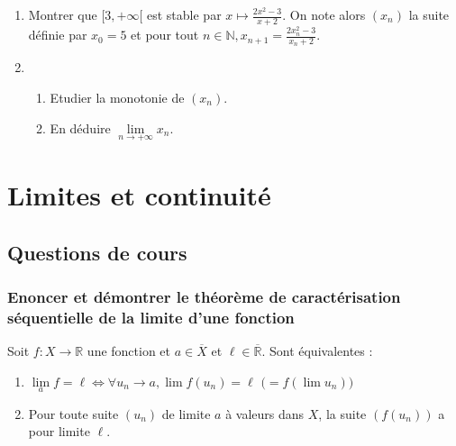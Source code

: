 \documentclass[titlepage, twoside]{report}
\begin{document}
\begin{tcolorbox}[title=Exercice 3, title filled=false, colframe=darkgreen, colback=darkgreen!10!white]
    \begin{enumerate}
        \item Montrer que $[3, +\infty[$ est stable par $x\mapsto \frac{2x^2 - 3}{x + 2}$. On note alors $(x_n)$ la suite définie par $x_0 = 5$ et pour tout $n \in \mathbb{N}, x_{n+1} = \frac{2x_n^2 - 3}{x_n + 2}$. 
        \item \begin{enumerate}
            \item Etudier la monotonie de $(x_n)$.
            \item En déduire $\lim\limits_{n\to +\infty} x_n$.
        \end{enumerate}
    \end{enumerate}
\end{tcolorbox}


\section{Limites et continuité}
\subsection{Questions de cours}
\subsubsection{Enoncer et démontrer le théorème de caractérisation séquentielle de la limite d'une fonction}
\begin{tcolorbox}[title=Théorème 15.34, title filled=false, colframe=orange, colback=orange!10!white]
    Soit $f:X\to \mathbb{R}$ une fonction et $a \in \overline{X}$ et $\ell \in \overline{\mathbb{R}}$. Sont équivalentes : 
    \begin{enumerate}
        \item $\lim\limits_a f = \ell \Leftrightarrow \forall u_n \to a, \lim f(u_n) = \ell \text{ ($= f(\lim u_n)$)}$
        \item Pour toute suite $(u_n)$ de limite $a$ à valeurs dans $X$, la suite $(f(u_n))$ a pour limite $\ell$. 
    \end{enumerate}
\end{tcolorbox}
\end{document}
